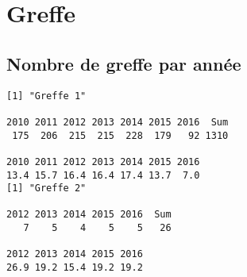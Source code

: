 \documentclass[11pt,a4paper]{article}\usepackage[]{graphicx}\usepackage[]{color}
\makeatletter
\newenvironment{kframe}{%
 \def\at@end@of@kframe{}%
 \ifinner\ifhmode%
  \def\at@end@of@kframe{\end{minipage}}%
  \begin{minipage}{\columnwidth}%
 \fi\fi%
 \def\FrameCommand##1{\hskip\@totalleftmargin \hskip-\fboxsep
 \colorbox{shadecolor}{##1}\hskip-\fboxsep
     \hskip-\linewidth \hskip-\@totalleftmargin \hskip\columnwidth}%
 \MakeFramed {\advance\hsize-\width
   \@totalleftmargin\z@ \linewidth\hsize
   \@setminipage}}%
 {\par\unskip\endMakeFramed%
 \at@end@of@kframe}
\newenvironment{knitrout}{}{} %
\makeatother
\begin{document}
\section{Greffe}

  \subsection{Nombre de greffe par année}

\begin{knitrout}
\color{fgcolor}\begin{kframe}
\begin{verbatim}
[1] "Greffe 1"

2010 2011 2012 2013 2014 2015 2016  Sum 
 175  206  215  215  228  179   92 1310 

2010 2011 2012 2013 2014 2015 2016 
13.4 15.7 16.4 16.4 17.4 13.7  7.0 
[1] "Greffe 2"

2012 2013 2014 2015 2016  Sum 
   7    5    4    5    5   26 

2012 2013 2014 2015 2016 
26.9 19.2 15.4 19.2 19.2 
\end{verbatim}
\end{kframe}
\end{knitrout}
\end{document}
